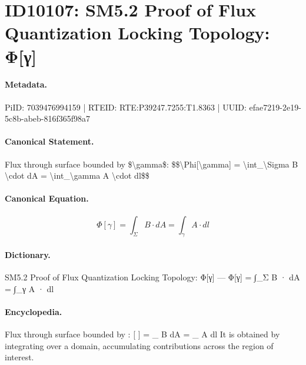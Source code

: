 \section*{ID10107: SM5.2 Proof of Flux Quantization Locking Topology: Φ[γ]}
\paragraph{Metadata.}
PiID: 7039476994159 | RTEID: RTE:P39247.7255:T1.8363 | UUID: efae7219-2e19-5c8b-abeb-816f365f98a7

\paragraph{Canonical Statement.}
Flux through surface bounded by \$\textbackslash{}gamma\$: \$\$\textbackslash{}Phi[\textbackslash{}gamma] = \textbackslash{}int\_\textbackslash{}Sigma B \textbackslash{}cdot dA = \textbackslash{}int\_\textbackslash{}gamma A \textbackslash{}cdot dl\$\$

\paragraph{Canonical Equation.}
\[
\Phi[\gamma] = \int_\Sigma B \cdot dA = \int_\gamma A \cdot dl
\]

\paragraph{Dictionary.}
SM5.2 Proof of Flux Quantization Locking Topology: Φ[γ] — Φ[γ] = ∫\_Σ B · dA = ∫\_γ A · dl

\paragraph{Encyclopedia.}
Flux through surface bounded by : [ ] = \_ B dA = \_ A dl It is obtained by integrating over a domain, accumulating contributions across the region of interest.

